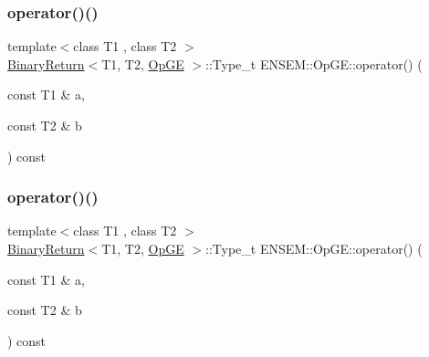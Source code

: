 \subsubsection{\texorpdfstring{operator()()}{operator()()}\hspace{0.1cm}{\footnotesize\ttfamily [1/3]}}
{\footnotesize\ttfamily template$<$class T1 , class T2 $>$ \\
\mbox{\hyperlink{structENSEM_1_1BinaryReturn}{Binary\+Return}}$<$T1, T2, \mbox{\hyperlink{structENSEM_1_1OpGE}{Op\+GE}} $>$\+::Type\+\_\+t E\+N\+S\+E\+M\+::\+Op\+G\+E\+::operator() (\begin{DoxyParamCaption}\item[{const T1 \&}]{a,  }\item[{const T2 \&}]{b }\end{DoxyParamCaption}) const\hspace{0.3cm}{\ttfamily [inline]}}

\mbox{\label{structENSEM_1_1OpGE_ab43afee7152159c15cf9af4203049d4b}} 
\subsubsection{\texorpdfstring{operator()()}{operator()()}\hspace{0.1cm}{\footnotesize\ttfamily [2/3]}}
{\footnotesize\ttfamily template$<$class T1 , class T2 $>$ \\
\mbox{\hyperlink{structENSEM_1_1BinaryReturn}{Binary\+Return}}$<$T1, T2, \mbox{\hyperlink{structENSEM_1_1OpGE}{Op\+GE}} $>$\+::Type\+\_\+t E\+N\+S\+E\+M\+::\+Op\+G\+E\+::operator() (\begin{DoxyParamCaption}\item[{const T1 \&}]{a,  }\item[{const T2 \&}]{b }\end{DoxyParamCaption}) const\hspace{0.3cm}{\ttfamily [inline]}}

\mbox{\label{structENSEM_1_1OpGE_ab43afee7152159c15cf9af4203049d4b}} 
